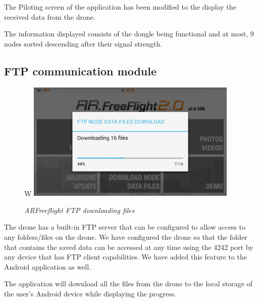 The Piloting screen of the application has been modified to the display the received data from the drone.

The information displayed consists of the dongle being functional and at most, 9 nodes sorted descending after their signal strength.

\subsection{FTP communication module}

\begin{figure}[ht]
\begin{center}W
\includegraphics[width=0.9\textwidth]{implementation/android_ftp.png}
\end{center}
\caption{\small \itshape{ARFreeflight FTP downloading files}}
\end{figure}

The drone has a built-in FTP server that can be configured to allow access to any folders/files on the drone. We have configured the drone so that the folder that contains the saved data can be accessed at any time using the 4242 port by any device that has FTP client capabilities. We have added this feature to the Android application as well.

The application will download all the files from the drone to the local storage of the user's Android device while displaying the progress.
